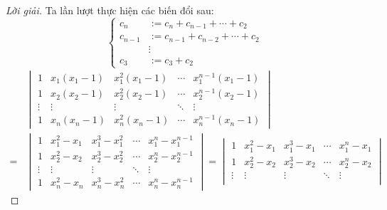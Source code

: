 \documentclass[class=nhvh-linear-algebra,crop=false]{standalone}
\begin{document}
\begin{proof}[Lời giải]
    \par Ta lần lượt thực hiện các biến đổi sau:
    \[
        \begin{cases}
            c_{n}   & := c_{n} + c_{n-1} + \cdots + c_{2}   \\
            c_{n-1} & := c_{n-1} + c_{n-2} + \cdots + c_{2} \\
                    & \vdots                                \\
            c_{3}   & := c_{3} + c_{2}
        \end{cases}
    \]
    \begingroup{}
    \allowdisplaybreaks{}
    \begin{align*}
          & \begin{vmatrix}
                1      & x_{1}(x_{1} - 1) & x_{1}^{2}(x_{1} - 1) & \cdots & x_{1}^{n-1}(x_{1} - 1) \\
                1      & x_{2}(x_{2} - 1) & x_{2}^{2}(x_{2} - 1) & \cdots & x_{2}^{n-1}(x_{2} - 1) \\
                \vdots & \vdots           & \vdots               & \ddots & \vdots                 \\
                1      & x_{n}(x_{n} - 1) & x_{n}^{2}(x_{n} - 1) & \cdots & x_{n}^{n-1}(x_{n} - 1)
            \end{vmatrix}                                                                                                                                               \\
        = &
        \begin{vmatrix}
            1      & x_{1}^{2} - x_{1} & x_{1}^{3} - x_{1}^{2} & \cdots & x_{1}^{n} - x_{1}^{n-1} \\
            1      & x_{2}^{2} - x_{2} & x_{2}^{3} - x_{2}^{2} & \cdots & x_{2}^{n} - x_{2}^{n-1} \\
            \vdots & \vdots            & \vdots                & \ddots & \vdots                  \\
            1      & x_{n}^{2} - x_{n} & x_{n}^{3} - x_{n}^{2} & \cdots & x_{n}^{n} - x_{n}^{n-1}
        \end{vmatrix}
        =
        \begin{vmatrix}
            1      & x_{1}^{2} - x_{1} & x_{1}^{3} - x_{1} & \cdots & x_{1}^{n} - x_{1} \\
            1      & x_{2}^{2} - x_{2} & x_{2}^{3} - x_{2} & \cdots & x_{2}^{n} - x_{2} \\
            \vdots & \vdots            & \vdots            & \ddots & \vdots            \\

\end{vmatrix}
\end{align*}
\end{proof}
\end{document}
